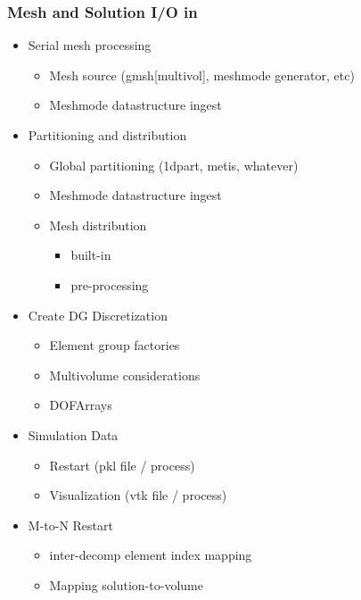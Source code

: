 \begin{frame}\frametitle{Mesh and Solution I/O in \mirgecom{}}
\begin{multicols}{2}
  \begin{itemize}
    \item Serial mesh processing
    \begin{itemize}
    \item Mesh source (gmsh[multivol], meshmode generator, etc)
    \item Meshmode datastructure ingest
    \end{itemize}
    \item Partitioning and distribution
    \begin{itemize}
    \item Global partitioning (1dpart, metis, whatever)
    \item Meshmode datastructure ingest
    \item Mesh distribution
    \begin{itemize}
    \item built-in
    \item pre-processing
    \end{itemize}
    \end{itemize}
    \item Create DG Discretization
    \begin{itemize}
    \item Element group factories
    \item Multivolume considerations
    \item DOFArrays
    \end{itemize}
    \item Simulation Data
    \begin{itemize}
    \item Restart (pkl file / process)
    \item Visualization  (vtk file / process)
    \end{itemize}
    \item M-to-N Restart
    \begin{itemize}
    \item inter-decomp element index mapping
    \item Mapping solution-to-volume
    \end{itemize}
  \end{itemize}
  \end{multicols}
\end{frame}

